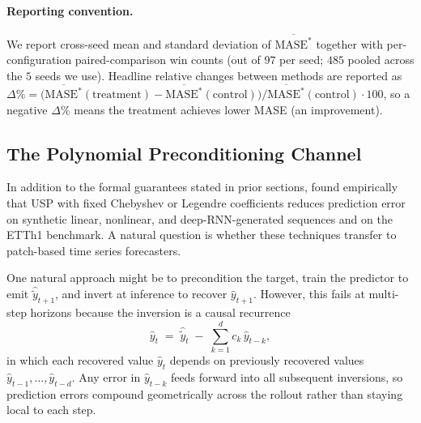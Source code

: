 \documentclass[11pt]{article}
\theoremstyle{plain}
\theoremstyle{definition}
\theoremstyle{remark}
\newcommand{\Baseline}{\textsf{Baseline}}
\begin{document}

\paragraph{Reporting convention.}
We report cross-seed mean and standard deviation of $\overline{\mathrm{MASE}^*}$ together with per-configuration paired-comparison win counts (out of $97$ per seed; $485$ pooled across the $5$ seeds we use). Headline relative changes between methods are reported as $\Delta\% = \big(\overline{\mathrm{MASE}^*}(\text{treatment}) - \overline{\mathrm{MASE}^*}(\text{control})\big) / \overline{\mathrm{MASE}^*}(\text{control}) \cdot 100$, so a negative $\Delta\%$ means the treatment achieves lower MASE (an improvement). 



\subsection{The Polynomial Preconditioning Channel}
\label{sec:method}
In addition to the formal guarantees stated in prior sections, \citet{marsden2024universal} found empirically that USP with fixed Chebyshev or Legendre coefficients reduces prediction error on synthetic linear, nonlinear, and deep-RNN-generated sequences and on the ETTh1 benchmark. A natural question is whether these techniques transfer to patch-based time series forecasters.

One natural approach might be to precondition the target, train the predictor to emit $\hat{\tilde y}_{t+1}$, and invert at inference to recover $\hat y_{t+1}$. However, this fails at multi-step horizons because the inversion is a causal recurrence
\[
\hat y_t \;=\; \hat{\tilde y}_t \;-\; \sum_{k=1}^{d} c_k\, \hat y_{t-k},
\]
in which each recovered value $\hat y_t$ depends on previously recovered values $\hat y_{t-1}, \ldots, \hat y_{t-d}$. Any error in $\hat y_{t-k}$ feeds forward into all subsequent inversions, so prediction errors compound geometrically across the rollout rather than staying local to each step.
\end{document}
